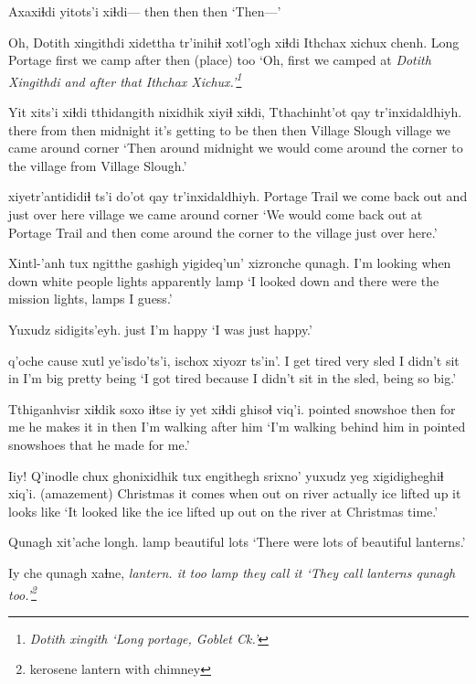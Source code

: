 \documentclass[12pt]{article}
\begin{document}
\gll Axaxiɬdi yitots'i xiɬdi---
then     then     then  
\glt `Then---'
\glend

\gll Oh, {Dotith xingithdi} xidettha tr'inihiɬ xotl'ogh xiɬdi {Ithchax xichux} chenh.
{} {Long Portage} first {we camp} after then (place) too
\glt `Oh, first we camped at \em Dotith Xingithdi \em and after that \em Ithchax Xichux.'\footnote{\em Dotith xingith `Long portage, Goblet Ck.'}
\glend

\gll Yit xits'i xiɬdi tthidangith nixidhik xiyiɬ xiɬdi, Tthachinht'ot qay tr'inxidaldhiyh.
there from then  midnight    {it's getting to be} then then {Village Slough}   village     {we came around corner}
\glt `Then around midnight we would come around the corner to the village from Village Slough.'
\glend

 xiyetr'antididiɬ ts'i do'ot   qay tr'inxidaldhiyh.
{Portage Trail}       {we come back out} and {just over here} village {we came around corner}
\glt `We would come back out at Portage Trail and then come around the corner to the village just over here.'
\glend

\gll Xintl-'anh tux ngitthe gashigh yigideq'un' xizronche qunagh.
{I'm looking} when down {white people} lights apparently lamp
\glt `I looked down and there were the mission lights, lamps I guess.'
\glend

\gll Yuxudz sidigits'eyh.
just   {I'm happy}
\glt `I was just happy.'
\glend

 q'oche cause xutl {ye'isdo'ts'i,} ischox xiyozr ts'in'.
{I get tired} {very} {}            sled {I didn't sit in} {I'm big} pretty being
\glt `I got tired because I didn't sit in the sled, being so big.'
\glend

\gll Tthiganhvisr       xiɬdik soxo iɬtse  iy yet xiɬdi ghisoɬ viq'i.
{pointed snowshoe} then   {for me} {he makes} it in then {I'm walking} {after him}
\glt `I'm walking behind him in pointed snowshoes that he made for me.'
\glend

\gll Iiy! {Q'inodle chux} ghonixidhik tux engithegh srixno' {yuxudz yeg} xigidigheghiɬ    xiq'i.
{(amazement)}  Christmas {it comes} when      {out on} river    actually           {ice lifted up} {it looks like}
\glt `It looked like the ice lifted up out on the river at Christmas time.'
\glend

\gll Qunagh xit'ache longh.
lamp   beautiful lots
\glt `There were lots of beautiful lanterns.'
\glend

\gll Iy che qunagh xaɬne, \em{lantern}.
it too lamp  {they call it}
\glt `They call lanterns \em qunagh \em too.'\footnote{kerosene lantern with chimney}
\glend
\end{document}
